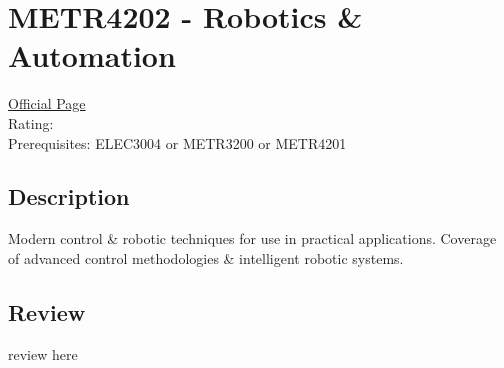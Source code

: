 \hypertarget{METR4202}{\section{METR4202 - Robotics \& Automation}}

\large
\textcolor{turbo_purple}{\href{https://my.uq.edu.au/programs-courses/course.html?course_code=METR4202}{Official Page}} \\
Rating: \cstar\cstar\cstar\cstar\ostar \\
Prerequisites: ELEC3004 or METR3200 or METR4201

\normalsize
\subsection*{Description}
Modern control \& robotic techniques for use in practical applications.
Coverage of advanced control methodologies \& intelligent robotic systems.

\subsection*{Review}
review here

